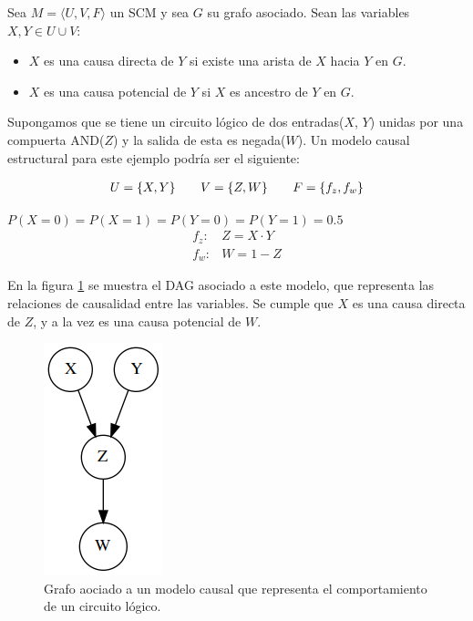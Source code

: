 \begin{dfn}
	Sea $M=\langle U,V,F \rangle$ un SCM y sea $G$ su grafo asociado. Sean las variables $X,Y \in U\cup V$:
	\begin{itemize}
		\item $X$ es una causa directa de $Y$ si existe una arista de $X$ hacia $Y$ en $G$.
		\item $X$ es una causa potencial de $Y$ si $X$ es ancestro de $Y$ en $G$.
	\end{itemize}
\end{dfn}

Supongamos que se tiene un circuito lógico de dos entradas($X$, $Y$) unidas por una compuerta AND($Z$) y la salida de esta es negada($W$). Un modelo causal estructural para este ejemplo podría ser el siguiente:
\begin{model}
	\[
	\arraycolsep=10pt
	\begin{array}{ccc}
		U = \{X, Y\}&
		V = \{Z, W\}&
		F = \{f_z, f_w\}
	\end{array}
	\]
	
	\begin{center}
		$P(X=0)=P(X=1)=P(Y=0)=P(Y=1)=0.5$
		\[
		\begin{array}{cc}
			f_z: & Z = X \cdot Y \\ 
			f_w: & W = 1 - Z
		\end{array} 
		\]
	\end{center}
\end{model}

En la figura \ref{fig:scm} se muestra el DAG asociado a este modelo, que representa las relaciones de causalidad entre las variables. Se cumple que $X$ es una causa directa de $Z$, y a la vez es una causa potencial de $W$.

\begin{figure}[h!]
	\centering
	\includegraphics[width=0.2\linewidth]{./images/Chapter 2/pscm-example.png}
	\caption{Grafo aociado a un modelo causal que representa el comportamiento de un circuito lógico.}
	\label{fig:scm}
\end{figure}

